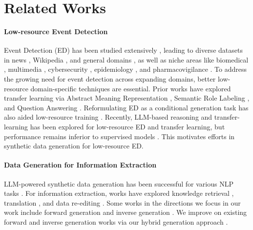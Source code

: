\section{Related Works}
\label{sec:related-works}

\paragraph{Low-resource Event Detection}
Event Detection (ED) has been studied extensively \cite{sundheim-1992-overview, grishman-sundheim-1996-message}, leading to diverse datasets in news \cite{doddington-etal-2004-automatic, song-etal-2015-light, DBLP:conf/tac/EllisGFKSBS15}, Wikipedia \cite{li-etal-2021-document, pouran-ben-veyseh-etal-2022-mee}, and general domains \cite{wang-etal-2020-maven, parekh-etal-2023-geneva}, as well as niche areas like biomedical \cite{mlee, kim-etal-2011-overview-genia, kim-etal-2013-genia}, multimedia \cite{li-etal-2020-cross}, cybersecurity \cite{casie}, epidemiology \cite{parekh-etal-2024-speed, parekh-etal-2024-event}, and pharmacovigilance \cite{sun-etal-2022-phee}.
To address the growing need for event detection across expanding domains, better low-resource domain-specific techniques are essential.
Prior works have explored transfer learning via Abstract Meaning Representation \cite{huang-etal-2018-zero}, Semantic Role Labeling \cite{zhang-etal-2021-zero}, and Question Answering \cite{lyu-etal-2021-zero}.
Reformulating ED as a conditional generation task has also aided low-resource training \cite{hsu-etal-2022-degree, hsu-etal-2023-ampere, huang-etal-2022-multilingual-generative}.
Recently, LLM-based reasoning \cite{DBLP:journals/corr/abs-2304-11633, DBLP:journals/corr/abs-2303-03836, wang-etal-2023-code4struct} and transfer-learning \cite{cai-etal-2024-improving-event} has been explored for low-resource ED  and transfer learning, but performance remains inferior to supervised models \cite{huang-etal-2024-textee}. 
This motivates efforts in synthetic data generation for low-resource ED.

\paragraph{Data Generation for Information Extraction}
LLM-powered synthetic data generation has been successful for various NLP tasks \cite{li-etal-2023-synthetic, wang-etal-2023-self-instruct, DBLP:journals/www/WuZQWGSQZZLXC24, shao-etal-2025-case2code}.
For information extraction, works have explored knowledge retrieval \cite{chen2023chain, amalvy-etal-2023-learning}, translation \cite{parekh-etal-2024-contextual, DBLP:conf/iclr/LeCR024}, and data re-editing \cite{DBLP:journals/corr/abs-2102-01335, hu-etal-2023-entity}.
Some works in the directions we focus in our work include forward generation \cite{chia-etal-2022-relationprompt, ye-etal-2022-zerogen, wang-etal-2023-improving-unsupervised, DBLP:journals/corr/abs-2303-04360} and inverse generation \cite{josifoski-etal-2023-exploiting, star}.
We improve on existing forward and inverse generation works via our hybrid generation approach \modelName.
